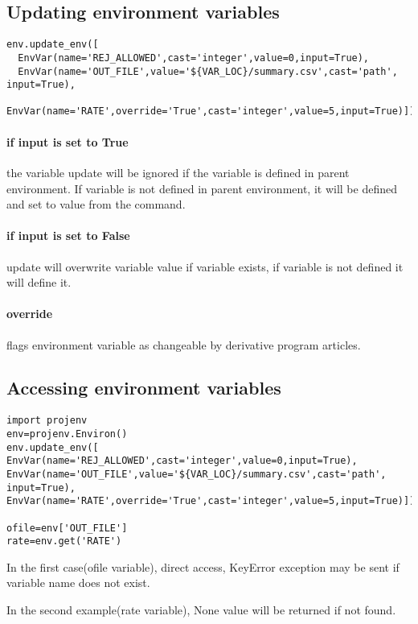 \documentclass[design.tex]{subfiles}
\begin{document}
\subsection{Updating environment variables}  
\begin{lstlisting}
env.update_env([
  EnvVar(name='REJ_ALLOWED',cast='integer',value=0,input=True),
  EnvVar(name='OUT_FILE',value='${VAR_LOC}/summary.csv',cast='path', input=True),
  EnvVar(name='RATE',override='True',cast='integer',value=5,input=True)])
\end{lstlisting}

\paragraph {if input is set to True} the variable update will be ignored if the variable is defined in parent environment. If variable is not defined in parent environment, it will be defined and set to value from the command. 
\paragraph {if input is set to False} update will overwrite variable value if variable exists, if variable is not defined it will define it.
\paragraph{override} flags environment variable as changeable by derivative program articles.

\subsection{Accessing environment variables} 
\begin{lstlisting}
import projenv 
env=projenv.Environ()
env.update_env([
EnvVar(name='REJ_ALLOWED',cast='integer',value=0,input=True),
EnvVar(name='OUT_FILE',value='${VAR_LOC}/summary.csv',cast='path', input=True),
EnvVar(name='RATE',override='True',cast='integer',value=5,input=True)])

ofile=env['OUT_FILE']
rate=env.get('RATE')
\end{lstlisting}

In the first case(ofile variable), direct access, KeyError exception may be sent if variable name does not exist.

In the second example(rate variable), None value will be returned if not found. 
\end{document}

